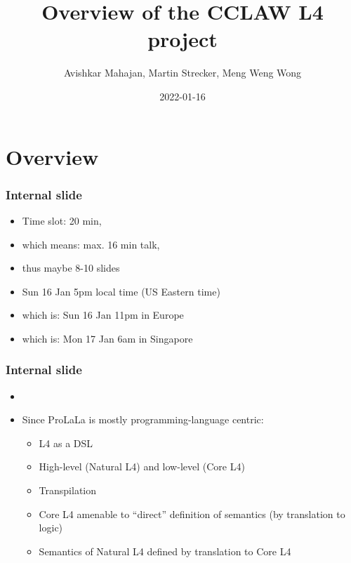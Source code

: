 \documentclass{beamer}
\title{Overview of the CCLAW L4 project}
\author{Avishkar Mahajan, Martin Strecker, Meng Weng Wong}
\date{2022-01-16}
\begin{document}

\begin{frame}
  \titlepage
\end{frame}



\section{Overview}


\begin{frame}[fragile]\frametitle{Internal slide}

  
  \begin{itemize}
  \item Time slot: 20 min, 
  \item which means: max. 16 min talk, 
  \item thus maybe 8-10 slides
  \end{itemize}

  \begin{itemize}
  \item Sun 16 Jan 5pm local time (US Eastern time)
  \item which is: Sun 16 Jan 11pm in Europe
  \item which is: Mon 17 Jan 6am in Singapore
  \end{itemize}

\end{frame}


\begin{frame}[fragile]\frametitle{Internal slide}




  \begin{itemize}
  \item {}
  \item Since ProLaLa is mostly programming-language centric:
    \begin{itemize}
    \item L4 as a DSL
    \item High-level (Natural L4) and low-level (Core L4)
    \item Transpilation
    \item Core L4 amenable to ``direct'' definition of semantics (by translation to logic)
    \item Semantics of Natural L4 defined by translation to Core L4
    \end{itemize}
  \end{itemize}

\end{frame}
\end{document}
